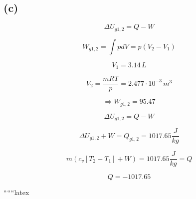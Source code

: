 

\subsection*{(c)}

\[
\Delta U_{g1,2} = Q - W
\]

\[
W_{g1,2} = \int p dV = p (V_2 - V_1)
\]

\[
V_1 = 3.14 \, L
\]

\[
V_2 = \frac{mRT}{p} = 2.477 \cdot 10^{-3} \, m^3
\]

\[
\Rightarrow W_{g1,2} = 95.47
\]

\[
\Delta U_{g1,2} = Q - W
\]

\[
\Delta U_{g1,2} + W = Q_{g1,2} = 1017.65 \frac{J}{kg}
\]

\[
m (c_v [T_2 - T_1] + W) = 1017.65 \frac{J}{kg} = Q
\]

\[
Q = -1017.65
\]

``````latex